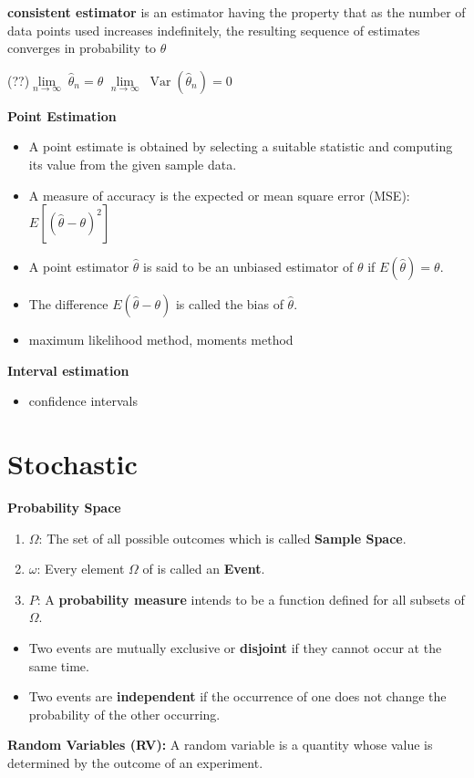\documentclass{../cheat}
\begin{document}
\begin{multicols}{3}
	 \textbf{consistent estimator} is an estimator having the property that as the number of data points used increases indefinitely, the resulting sequence of estimates converges in probability to $\theta$\\
	 \centerline{(??)$\underset{n\to\infty}{\lim}\;\hat{\theta}_n = \theta$
	 	\quad $\underset{n\to\infty}{\lim}\;\operatorname{Var}(\hat{\theta}_n) = 0$}
	 
	\textbf{Point Estimation}
	\begin{itemize}
		\item A point estimate is obtained by selecting a suitable statistic and computing its value from the given sample data. 
		\item A measure of accuracy is the expected or mean square error (MSE): $E[(\hat{\theta}- \theta)^2]$
		\item A point estimator $\hat{\theta}$ is said to be an unbiased estimator of $\theta$ if $E(\hat{\theta}) = \theta$.
		\item The difference $E(\hat{\theta}- \theta)$ is called the bias of $\hat{\theta}$.
		\item maximum likelihood method, moments method
	\end{itemize}

	\textbf{Interval estimation}
	\begin{itemize}
		\item confidence intervals
	\end{itemize}				

	
	\section{Stochastic}
	
	\textbf{Probability Space}
	\begin{enumerate}
		\item $\Omega$: The set of all possible outcomes which is called \textbf{Sample Space}.
		\item $\omega$: Every element $\Omega$ of is called an \textbf{Event}.
		\item $P$: A \textbf{probability measure} intends to be a function defined for all subsets of $\Omega$.
	\end{enumerate}
	\begin{itemize}
		\item Two events are mutually exclusive or \textbf{disjoint} if they cannot occur at the same time.
		\item Two events are \textbf{independent} if the occurrence of one does not change the probability of the other occurring.
	\end{itemize}
	\textbf{Random Variables (RV):} A random variable is a quantity whose value is determined by the outcome of an experiment.
	

\end{multicols}
\end{document}
